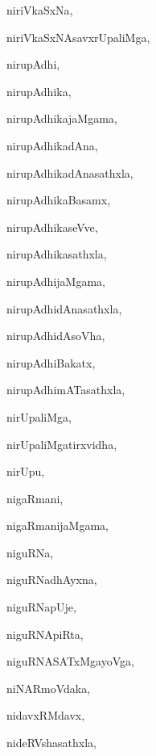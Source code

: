 \begin{multicols}{3}
{\noindent
{niriVkaSxNa}, \pageref{niriVkaSxNa}

\noindent
{niriVkaSxNAsavxrUpaliMga}, \pageref{niriVkaSxNAsavxrUpaliMga}

\noindent
{nirupAdhi}, \pageref{nirupAdhi}

\noindent
{nirupAdhika}, \pageref{nirupAdhika}

\noindent
{nirupAdhikajaMgama}, \pageref{nirupAdhikajaMgama}

\noindent
{nirupAdhikadAna}, \pageref{nirupAdhikadAna}

\noindent
{nirupAdhikadAnasathxla}, \pageref{nirupAdhikadAnasathxla}

\noindent
{nirupAdhikaBasamx}, \pageref{nirupAdhikaBasamx}

\noindent
{nirupAdhikaseVve}, \pageref{nirupAdhikaseVve}

\noindent
{nirupAdhikasathxla}, \pageref{nirupAdhikasathxla}

\noindent
{nirupAdhijaMgama}, \pageref{nirupAdhijaMgama}

\noindent
{nirupAdhidAnasathxla}, \pageref{nirupAdhidAnasathxla}

\noindent
{nirupAdhidAsoVha}, \pageref{nirupAdhidAsoVha}

\noindent
{nirupAdhiBakatx}, \pageref{nirupAdhiBakatx}

\noindent
{nirupAdhimATasathxla}, \pageref{nirupAdhimATasathxla}

\noindent
{nirUpaliMga}, \pageref{nirUpaliMga}

\noindent
{nirUpaliMgatirxvidha}, \pageref{nirUpaliMgatirxvidha}

\noindent
{nirUpu}, \pageref{nirUpu}

\noindent
{nigaRmani}, \pageref{nigaRmani}

\noindent
{nigaRmanijaMgama}, \pageref{nigaRmanijaMgama}

\noindent
{niguRNa}, \pageref{niguRNa}

\noindent
{niguRNadhAyxna}, \pageref{niguRNadhAyxna}

\noindent
{niguRNapUje}, \pageref{niguRNapUje}

\noindent
{niguRNApiRta}, \pageref{niguRNApiRta}

\noindent
{niguRNASATxMgayoVga}, \pageref{niguRNASATxMgayoVga}

\noindent
{niNARmoVdaka}, \pageref{niNARmoVdaka}

\noindent
{nidavxRMdavx}, \pageref{nidavxRMdavx}

\noindent
{nideRVshasathxla}, \pageref{nideRVshasathxla}

}
\end{multicols}
